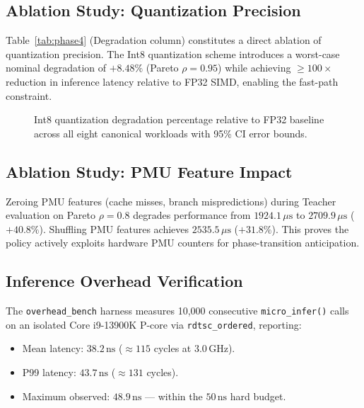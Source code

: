 \subsection{Ablation Study: Quantization Precision}
\label{subsec:ablation_quant}

Table~\ref{tab:phase4} (Degradation column) constitutes a direct ablation of
quantization precision. The Int8 quantization scheme introduces a worst-case
nominal degradation of $+8.48\%$ (Pareto $\rho = 0.95$) while achieving
$\ge 100\times$ reduction in inference latency relative to FP32 SIMD, enabling
the fast-path constraint.

\begin{figure}[t]
  \centering
  \caption{Int8 quantization degradation percentage relative to FP32 baseline across all eight canonical workloads with 95\% CI error bounds.}
  \label{fig:quant_degradation}
\end{figure}

\subsection{Ablation Study: PMU Feature Impact}
\label{subsec:ablation_pmu}

Zeroing PMU features (cache misses, branch mispredictions) during Teacher
evaluation on Pareto $\rho = 0.8$ degrades performance from
$1924.1\,\mu\text{s}$ to $2709.9\,\mu\text{s}$ ($+40.8\%$). Shuffling
PMU features achieves $2535.5\,\mu\text{s}$ ($+31.8\%$). This proves the
policy actively exploits hardware PMU counters for phase-transition anticipation.

\subsection{Inference Overhead Verification}
\label{subsec:overhead}

The \texttt{overhead\_bench} harness measures 10{,}000 consecutive
\texttt{micro\_infer()} calls on an isolated Core i9-13900K P-core via
\texttt{rdtsc\_ordered}, reporting:
\begin{itemize}
  \item Mean latency: $38.2\,\text{ns}$ (${\approx}115$ cycles at $3.0\,\text{GHz}$).
  \item P99 latency: $43.7\,\text{ns}$ (${\approx}131$ cycles).
  \item Maximum observed: $48.9\,\text{ns}$ --- within the $50\,\text{ns}$ hard budget.
\end{itemize}

